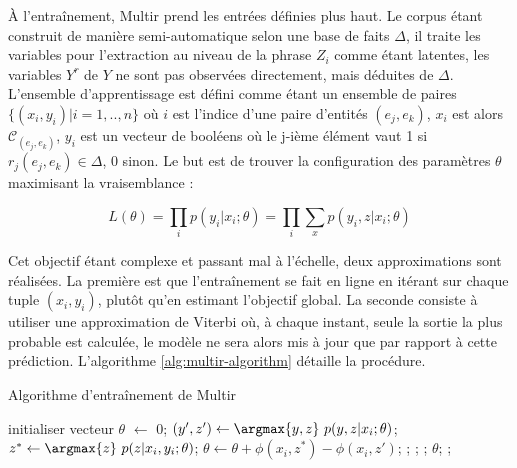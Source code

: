 \documentclass[12pt,a4paper,times,twoside,openright]{report}
\begin{document}
À l'entraînement, Multir prend les entrées définies plus haut. Le corpus étant construit de manière semi-automatique selon une base de faits $\Delta$, il traite les variables pour l'extraction au niveau de la phrase $Z_{i}$ comme étant latentes, les variables $Y^{r}$ de $Y$ ne sont pas observées directement, mais déduites de $\Delta$. L'ensemble d'apprentissage est défini comme étant un ensemble de paires $\{(x_{i},y_{i}) | i = 1,..,n\}$ où $i$ est l'indice d'une paire d'entités $(e_{j},e_{k})$, $x_{i}$ est alors $\mathcal{C}_{(e_{j},e_{k})}$, $y_{i}$ est un vecteur de booléens où le j-ième élément vaut 1 si $r_{j}(e_{j},e_{k}) \in \Delta$, 0 sinon. Le but est de trouver la configuration des paramètres $\theta$ maximisant la vraisemblance :

\begin{equation} \label{eq:multir-likelihood}
L(\theta) = \prod_{i} p(y_{i}|x_{i};\theta) = \prod_{i} \sum_{x} p(y_{i},z|x_{i};\theta)
\end{equation}

Cet objectif étant complexe et passant mal à l'échelle, deux approximations sont réalisées. La première est que l'entraînement se fait en ligne en itérant sur chaque tuple $(x_{i},y_{i})$, plutôt qu'en estimant l'objectif global. La seconde consiste à utiliser une approximation de Viterbi où, à chaque instant, seule la sortie la plus probable est calculée, le modèle ne sera alors mis à jour que par rapport à cette prédiction. L'algorithme \ref{alg:multir-algorithm} détaille la procédure.

\begin{algorithm}[ht!]
\caption{Algorithme d'entraînement de Multir}
\label{alg:multir-algorithm}
\begin{algorithmic}
    \State {}
    \State initialiser vecteur $\theta$ $\gets$ 0;
            \State $(y',z') \gets \argmax{y,z}\ p(y,z | x_{i} ; \theta)$;
                \State $z^{*} \gets \argmax{z}\ p(z|x_{i},y_{i};\theta)$;
                \State $\theta \gets \theta + \phi(x_{i},z^{*}) - \phi(x_{i},z')$;
            \EndIf;
        \EndFor;
    \EndFor;
    \State \Return $\theta$;
    \EndFunction;
\end{algorithmic}
\end{algorithm}
\end{document}
